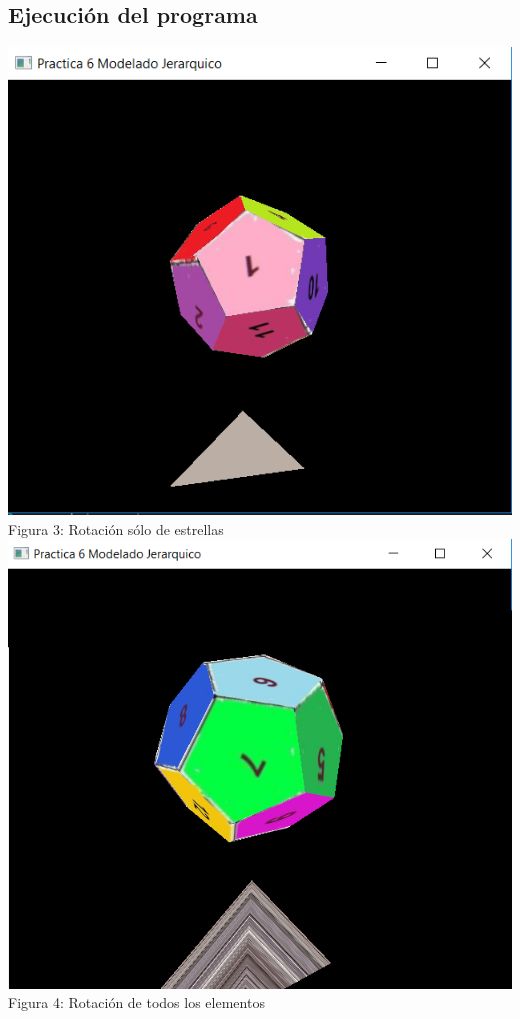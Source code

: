 \documentclass[12pt, a4paper]{article}
\begin{document}
\subsection{Ejecución del programa}	
\centering 
		\includegraphics[scale = .89]{img/ej1.png}\\[.05cm] %
		Figura 3: Rotación sólo de estrellas\\[.65cm]
		
		\includegraphics[scale = .84]{img/ej2.png}\\[.05cm] %
		Figura 4: Rotación de todos los elementos\\[.65cm]
\end{document}
